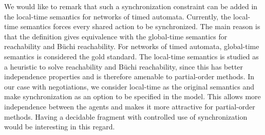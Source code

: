We would like to remark that such a synchronization constraint can be
added in the local-time semantics for networks of timed
automata. Currently, the local-time semantics forces every shared
action to be synchronized. The main reason is that the definition
gives equivalence with the global-time semantics for reachability and
B\"uchi reachability. For networks of timed automata, global-time
semantics is considered the gold standard. The local-time semantics is
studied as a heuristic to solve reachability and B\"uchi reachability,
since this has better independence properties and is therefore
amenable to partial-order methods.  In our case with negotiations, we
consider local-time as the original semantics and make synchronization
as an option to be specified in the model. This allows more
independence between the agents and makes it more attractive for
partial-order methods. Having a decidable fragment with controlled use
of synchronization would be interesting in this regard. 
